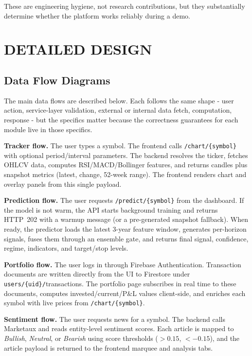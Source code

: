 \documentclass[12pt,a4paper]{report}
\numberwithin{equation}{chapter}
\begin{document}
These are engineering hygiene, not research contributions, but they substantially determine whether the platform works reliably during a demo.

\section{DETAILED DESIGN}

\subsection{Data Flow Diagrams}

The main data flows are described below. Each follows the same shape - user action, service-layer validation, external or internal data fetch, computation, response - but the specifics matter because the correctness guarantees for each module live in those specifics.

\textbf{Tracker flow.} The user types a symbol. The frontend calls \texttt{/chart/}\texttt{\{symbol\}} with optional period/interval parameters. The backend resolves the ticker, fetches OHLCV data, computes RSI/MACD/Bollinger features, and returns candles plus snapshot metrics (latest, change, 52-week range). The frontend renders chart and overlay panels from this single payload.

\textbf{Prediction flow.} The user requests \texttt{/predict/}\texttt{\{symbol\}} from the dashboard. If the model is not warm, the API starts background training and returns HTTP~202 with a warmup message (or a pre-generated snapshot fallback). When ready, the predictor loads the latest 3-year feature window, generates per-horizon signals, fuses them through an ensemble gate, and returns final signal, confidence, regime, indicators, and target/stop levels.

\textbf{Portfolio flow.} The user logs in through Firebase Authentication. Transaction documents are written directly from the UI to Firestore under \texttt{users/\{uid\}/}transactions. The portfolio page subscribes in real time to these documents, computes invested/current/P\&L values client-side, and enriches each symbol with live prices from \texttt{/chart/}\texttt{\{symbol\}}.

\textbf{Sentiment flow.} The user requests news for a symbol. The backend calls Marketaux and reads entity-level sentiment scores. Each article is mapped to \textit{Bullish}, \textit{Neutral}, or \textit{Bearish} using score thresholds ($>0.15$, $<-0.15$), and the article payload is returned to the frontend marquee and analysis tabs.
\end{document}
